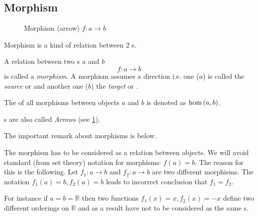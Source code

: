\subsection{Morphism}

\begin{figure}
  \centering
  \caption{Morphism (arrow) $f: a \to b $}
  \label{fig:morphism}
\end{figure}


Morphism is a kind of relation between 2 s.
\begin{definition}[Morphism]
  \label{def:morphism}
  A relation between two s $a$ and $b$ 
  \[
  f: a \rightarrow b
  \]
  is called a \textit{morphism}. A morphism assumes a direction i.e. one
  ($a$) is called the \textit{source} or  and another one ($b$)
  the \textit{target} or .

  The  of all morphisms between objects $a$ and $b$
  is denoted as $\catmset{a}{b}$.
\end{definition}

\begin{definition}[Arrow]
  \label{def:arrow}
  s are also called \textit{Arrows} (see
  \cref{fig:morphism}). 
\end{definition}

The important remark about morphisms is below.
\begin{remark}[Morphism]
\label{rem:morphism}
The morphism has to be considered as a relation between objects. We
will avoid standard (from set theory) notation for morphisms: $f(a) =
b$. The reason for this is the following. Let $f_1: a \to b$ and $f_2:
a \to b$ are two different morphisms. The notation $f_1(a) = b, f_2(a) =
b$ leads to incorrect conclusion that $f_1 = f_2$. 

For instance if $a
= b = \mathbb{R}$ then two functions $f_1(x) = x, f_2(x) = -x$ define two
different orderings on $\mathbb{R}$ and as a result have not to be
considered as the same s.
\end{remark}

